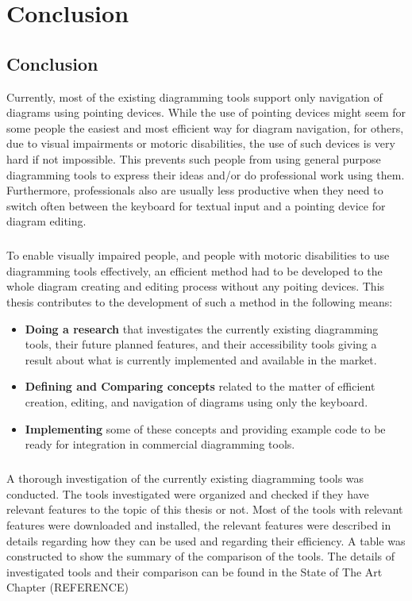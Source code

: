 \chapter{Conclusion}
\beginchapter

\section{Conclusion}
Currently, most of the existing diagramming tools support only navigation of diagrams using pointing devices. While the use of pointing devices might seem for some people the easiest and most efficient way for diagram navigation, for others, due to visual impairments or motoric disabilities, the use of such devices is very hard if not impossible. This prevents such people from using general purpose diagramming tools to express their ideas and/or do professional work using them. Furthermore, professionals also are usually less productive when they need to switch often between the keyboard for textual input and a pointing device for diagram editing. 

\paragraph{}
To enable visually impaired people, and people with motoric disabilities to use diagramming tools effectively, an efficient method had to be developed to the whole diagram creating and editing process without any poiting devices. This thesis contributes to the development of such a method in the following means:
\begin{itemize}
\item {\bf Doing a research} that investigates the currently existing diagramming tools, their future planned features, and their accessibility tools giving a result about what is currently implemented and available in the market.
\item {\bf Defining and Comparing concepts} related to the matter of efficient creation, editing, and navigation of diagrams using only the keyboard.
\item {\bf Implementing} some of these concepts and providing example code to be ready for integration in commercial diagramming tools.
\end{itemize}

\paragraph{}
A thorough investigation of the currently existing diagramming tools was conducted. The tools investigated were organized and checked if they have relevant features to the topic of this thesis or not. Most of the tools with relevant features were downloaded and installed, the relevant features were described in details regarding how they can be used and regarding their efficiency. A table was constructed to show the summary of the comparison of the tools. The details of investigated tools and their comparison can be found in the State of The Art Chapter (REFERENCE)

